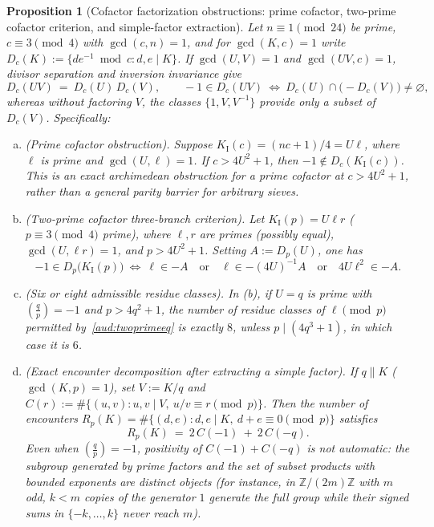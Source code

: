 \documentclass[11pt, a4paper]{article}
\theoremstyle{plain}
\newtheorem{proposition}[theorem]{Proposition}
\theoremstyle{definition}
\newcommand{\Z}{\mathbb{Z}}
\newcommand{\leg}[2]{\left(\frac{#1}{#2}\right)}
\newcommand{\I}{\mathrm{I}}
\begin{document}
\begin{proposition}[Cofactor factorization obstructions: prime cofactor, two-prime cofactor criterion, and simple-factor extraction]\label{aud:primecofactor}\label{aud:twoprime}\label{aud:eight}
Let $n\equiv1\pmod{24}$ be prime, $c\equiv3\pmod 4$ with $\gcd(c,n)=1$, and for $\gcd(K,c)=1$ write $D_c(K):=\{de^{-1}\bmod c:d,e\mid K\}$. If $\gcd(U,V)=1$ and $\gcd(UV,c)=1$, divisor separation and inversion invariance give
\begin{equation}\label{aud:Dproduct}
D_c(UV)\ =\ D_c(U)\,D_c(V),\qquad -1\in D_c(UV)\ \Longleftrightarrow\ D_c(U)\cap\big(-D_c(V)\big)\ne\varnothing,
\end{equation}
whereas without factoring $V$, the classes $\{1,V,V^{-1}\}$ provide only a subset of $D_c(V)$. Specifically:
\begin{enumerate}[(a)]
    \item \emph{(Prime cofactor obstruction).} Suppose $K_{\I}(c)=(nc+1)/4=U\ell$, where $\ell$ is prime and $\gcd(U,\ell)=1$. If $c>4U^{2}+1$, then $-1\notin D_c(K_{\I}(c))$. This is an exact archimedean obstruction for a prime cofactor at $c>4U^{2}+1$, rather than a general parity barrier for arbitrary sieves.
    \item \emph{(Two-prime cofactor three-branch criterion).} Let $K_{\I}(p)=U\ell r$ ($p\equiv3\pmod 4$ prime), where $\ell,r$ are primes (possibly equal), $\gcd(U,\ell r)=1$, and $p>4U^{2}+1$. Setting $A:=D_p(U)$, one has
    \begin{equation}\label{aud:twoprimeeq}
    -1\in D_p\big(K_{\I}(p)\big)\ \Longleftrightarrow\ \ell\in -A\quad\text{or}\quad \ell\in -(4U)^{-1}A\quad\text{or}\quad 4U\ell^{2}\in -A.
    \end{equation}
    \item \emph{(Six or eight admissible residue classes).} In (b), if $U=q$ is prime with $\leg{q}{p}=-1$ and $p>4q^{2}+1$, the number of residue classes of $\ell\pmod p$ permitted by~\eqref{aud:twoprimeeq} is exactly $8$, unless $p\mid(4q^{3}+1)$, in which case it is $6$.
    \item \emph{(Exact encounter decomposition after extracting a simple factor).} If $q\parallel K$ ($\gcd(K,p)=1$), set $V:=K/q$ and $C(r):=\#\{(u,v):u,v\mid V,\ u/v\equiv r\pmod p\}$. Then the number of encounters $R_p(K)=\#\{(d,e):d,e\mid K,\ d+e\equiv 0\pmod p\}$ satisfies
    \[
    R_p(K)\ =\ 2\,C(-1)\ +\ 2\,C(-q).
    \]
    Even when $\leg{q}{p}=-1$, positivity of $C(-1)+C(-q)$ is not automatic: the subgroup generated by prime factors and the set of subset products with bounded exponents are distinct objects (for instance, in $\Z/(2m)\Z$ with $m$ odd, $k<m$ copies of the generator $1$ generate the full group while their signed sums in $\{-k,\dots,k\}$ never reach $m$).
\end{enumerate}
\end{proposition}
\end{document}
